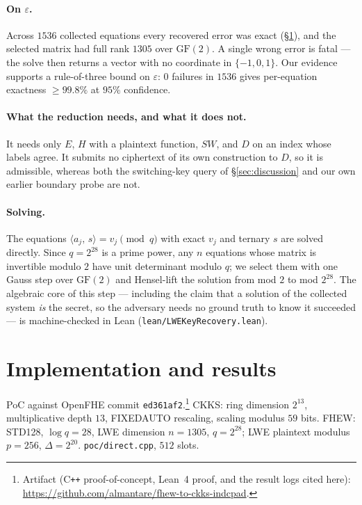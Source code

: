 \documentclass[11pt]{article}
\newcommand{\inner}[2]{\langle #1,\, #2\rangle}
\newcommand{\code}[1]{\texttt{#1}}
\newcommand{\artifacturl}{https://github.com/almantare/fhew-to-ckks-indcpad}
\begin{document}
\paragraph{On $\varepsilon$.}
Across $1536$ collected equations every recovered error was
exact (\S\ref{sec:results}), and the selected matrix had full rank $1305$ over $\mathrm{GF}(2)$. A
single wrong error is fatal --- the solve then returns a vector with no
coordinate in $\{-1,0,1\}$. Our evidence supports
a rule-of-three bound on $\varepsilon$: $0$ failures in $1536$ gives per-equation exactness
$\geq 99.8\%$ at $95\%$ confidence.

\paragraph{What the reduction needs, and what it does not.}
It needs only $E$, $H$ with a plaintext function, $\mathit{SW}$, and $D$ on an index whose labels
agree. It submits no ciphertext of its own construction to $D$, so it is admissible, whereas both the
switching-key query of \S\ref{sec:discussion} and our own
earlier boundary probe are not.

\paragraph{Solving.}
The equations $\inner{a_j}{s} = v_j \pmod q$ with exact $v_j$ and ternary $s$ are solved directly.
Since $q = 2^{28}$ is a prime power, any $n$ equations whose matrix is invertible modulo $2$ have
unit determinant modulo $q$; we select them with one Gauss step over $\mathrm{GF}(2)$ and
Hensel-lift the solution from mod $2$ to mod $2^{28}$. The algebraic core of this step --- including
the claim that a solution of the collected system \emph{is} the secret, so the adversary needs no
ground truth to know it succeeded --- is machine-checked in Lean (\code{lean/LWEKeyRecovery.lean}).

\section{Implementation and results}
\label{sec:results}

PoC against OpenFHE commit \code{ed361af2}.\footnote{Artifact (C\texttt{++} proof-of-concept,
Lean~4 proof, and the result logs cited here): \url{\artifacturl}.} CKKS: ring dimension $2^{13}$, multiplicative depth
$13$, FIXEDAUTO rescaling, scaling modulus $59$ bits. FHEW: STD128, $\log q = 28$, LWE dimension
$n = 1305$, $q = 2^{28}$; LWE plaintext modulus $p = 256$, $\Delta = 2^{20}$. \code{poc/direct.cpp},
$512$ slots.
\end{document}
